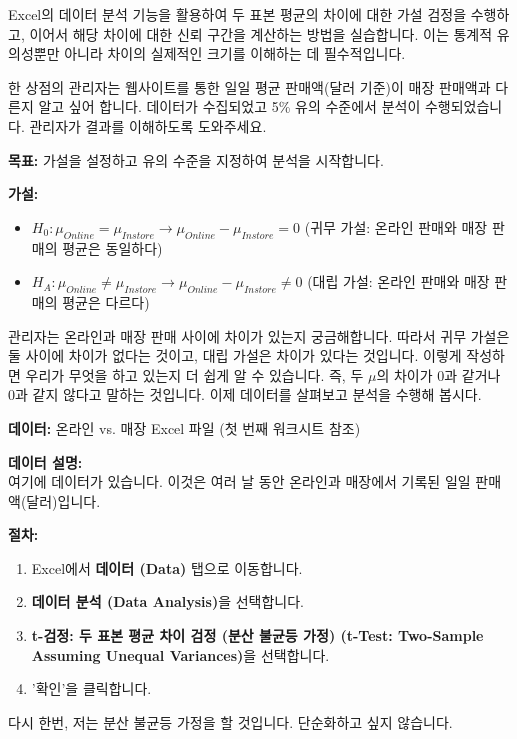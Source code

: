 \documentclass[11pt,a4paper]{article}
\begin{document}
\begin{summarybox}[title=핵심 요약: 가설 검정 후 신뢰 구간 계산]
Excel의 데이터 분석 기능을 활용하여 두 표본 평균의 차이에 대한 가설 검정을 수행하고, 이어서 해당 차이에 대한 신뢰 구간을 계산하는 방법을 실습합니다. 이는 통계적 유의성뿐만 아니라 차이의 실제적인 크기를 이해하는 데 필수적입니다.
\end{summarybox}

\begin{examplebox}[title=Excel 실습 예시: 온라인 vs. 매장 판매 (신뢰 구간)]
한 상점의 관리자는 웹사이트를 통한 일일 평균 판매액(달러 기준)이 매장 판매액과 다른지 알고 싶어 합니다. 데이터가 수집되었고 5\% 유의 수준에서 분석이 수행되었습니다. 관리자가 결과를 이해하도록 도와주세요.

\textbf{목표:} 가설을 설정하고 유의 수준을 지정하여 분석을 시작합니다.
\end{examplebox}

\begin{tcolorbox}[mybox, title=온라인/매장 Excel 워크시트 (2/10): 가설 설정]
\textbf{가설:}
\begin{itemize}
    \item $H_0 : \mu_{Online} = \mu_{Instore} \rightarrow \mu_{Online} - \mu_{Instore} = 0$ (귀무 가설: 온라인 판매와 매장 판매의 평균은 동일하다)
    \item $H_A : \mu_{Online} \neq \mu_{Instore} \rightarrow \mu_{Online} - \mu_{Instore} \neq 0$ (대립 가설: 온라인 판매와 매장 판매의 평균은 다르다)
\end{itemize}
관리자는 온라인과 매장 판매 사이에 차이가 있는지 궁금해합니다. 따라서 귀무 가설은 둘 사이에 차이가 없다는 것이고, 대립 가설은 차이가 있다는 것입니다. 이렇게 작성하면 우리가 무엇을 하고 있는지 더 쉽게 알 수 있습니다. 즉, 두 $\mu$의 차이가 0과 같거나 0과 같지 않다고 말하는 것입니다. 이제 데이터를 살펴보고 분석을 수행해 봅시다.
\end{tcolorbox}

\begin{tcolorbox}[mybox, title=온라인/매장 Excel 워크시트 (3/10): 데이터 준비]
\textbf{데이터:} 온라인 vs. 매장 Excel 파일 (첫 번째 워크시트 참조)

\textbf{데이터 설명:} \\
여기에 데이터가 있습니다. 이것은 여러 날 동안 온라인과 매장에서 기록된 일일 판매액(달러)입니다.
\end{tcolorbox}

\begin{tcolorbox}[mybox, title=온라인/매장 Excel 워크시트 (4/10): Excel에서 t-검정 선택]
\textbf{절차:}
\begin{enumerate}
    \item Excel에서 \textbf{데이터 (Data)} 탭으로 이동합니다.
    \item \textbf{데이터 분석 (Data Analysis)}을 선택합니다.
    \item \textbf{t-검정: 두 표본 평균 차이 검정 (분산 불균등 가정) (t-Test: Two-Sample Assuming Unequal Variances)}을 선택합니다.
    \item '확인'을 클릭합니다.
\end{enumerate}
다시 한번, 저는 분산 불균등 가정을 할 것입니다. 단순화하고 싶지 않습니다.
\end{tcolorbox}
\end{document}
